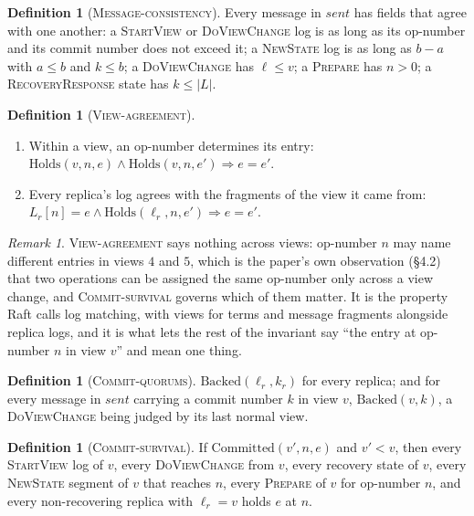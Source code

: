 \documentclass[11pt,a4paper]{article}
\theoremstyle{plain}
\theoremstyle{definition}
\newtheorem{definition}[theorem]{Definition}
\theoremstyle{remark}
\newtheorem{remark}[theorem]{Remark}
\newcommand{\msg}[1]{\textsc{#1}}
\newcommand{\dvc}{\msg{DoViewChange}}
\newcommand{\Holds}{\mathrm{Holds}}
\newcommand{\Committed}{\mathrm{Committed}}
\newcommand{\Backed}{\mathrm{Backed}}
\newcommand{\sent}{\mathit{sent}}
\newcommand{\WellFormed}{\textsc{Message-consistency}}
\newcommand{\OneLog}{\textsc{View-agreement}}
\newcommand{\CommitsBacked}{\textsc{Commit-quorums}}
\newcommand{\Survival}{\textsc{Commit-survival}}
\begin{document}
\begin{definition}[\WellFormed]
\label{def:wellformed}
Every message in $\sent$ has fields that agree with one another: a
\msg{StartView} or \msg{DoViewChange} log is as long as its op-number and
its commit number does not exceed it; a \msg{NewState} log is as long as
$b - a$ with $a \le b$ and $k \le b$; a \msg{DoViewChange} has
$\ell \le v$; a \msg{Prepare} has $n > 0$; a \msg{RecoveryResponse} state
has $k \le |L|$.
\end{definition}

\begin{definition}[\OneLog]
\label{def:viewagreement}
\leavevmode
\begin{enumerate}[nosep,label=(\roman*)]
  \item Within a view, an op-number determines its entry:
    $\Holds(v, n, e) \wedge \Holds(v, n, e') \Rightarrow e = e'$.
  \item Every replica's log agrees with the fragments of the view it
    came from: $L_r[n] = e \wedge \Holds(\ell_r, n, e') \Rightarrow e = e'$.
\end{enumerate}
\end{definition}

\begin{remark}
\OneLog{} says nothing across views: op-number $n$ may name different
entries in views $4$ and $5$, which is the paper's own observation
(\S4.2) that two operations can be assigned the same op-number only
across a view change, and \Survival{} governs which of them matter. It
is the property Raft calls log matching, with views for terms and message
fragments alongside replica logs, and it is what lets the rest of the
invariant say ``the entry at op-number $n$ in view $v$'' and mean one
thing.
\end{remark}

\begin{definition}[\CommitsBacked]
$\Backed(\ell_r, k_r)$ for every replica; and for every message in
$\sent$ carrying a commit number $k$ in view $v$, $\Backed(v, k)$, a
\dvc{} being judged by its last normal view.
\end{definition}

\begin{definition}[\Survival]
If $\Committed(v', n, e)$ and $v' < v$, then every \msg{StartView} log
of $v$, every \dvc{} from $v$, every recovery state of $v$, every
\msg{NewState} segment of $v$ that reaches $n$, every \msg{Prepare} of
$v$ for op-number $n$, and every non-recovering replica with
$\ell_r = v$ holds $e$ at $n$.
\end{definition}
\end{document}
